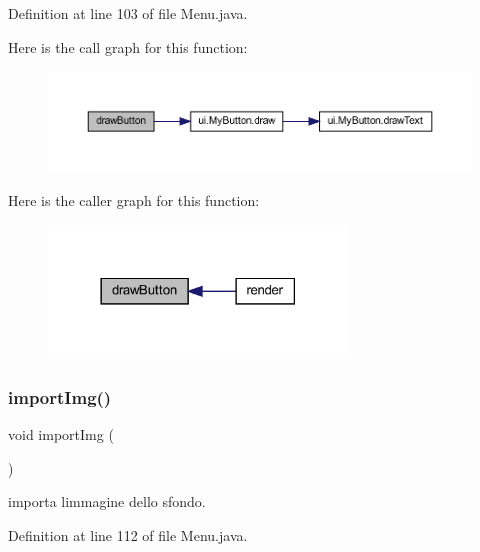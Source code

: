 Definition at line 103 of file Menu.\+java.

Here is the call graph for this function\+:\nopagebreak
\begin{figure}[H]
\begin{center}
\leavevmode
\includegraphics[width=350pt]{classscenes_1_1_menu_a65768678909bc0512c6cb9780709ad38_cgraph}
\end{center}
\end{figure}
Here is the caller graph for this function\+:\nopagebreak
\begin{figure}[H]
\begin{center}
\leavevmode
\includegraphics[width=225pt]{classscenes_1_1_menu_a65768678909bc0512c6cb9780709ad38_icgraph}
\end{center}
\end{figure}
\mbox{\label{classscenes_1_1_menu_ababe61393d9a835b23b1fd6675da3914}} 
\subsubsection{\texorpdfstring{import\+Img()}{importImg()}}
{\footnotesize\ttfamily void import\+Img (\begin{DoxyParamCaption}{ }\end{DoxyParamCaption})\hspace{0.3cm}{\ttfamily [private]}}



importa l\textquotesingle{}immagine dello sfondo. 



Definition at line 112 of file Menu.\+java.

